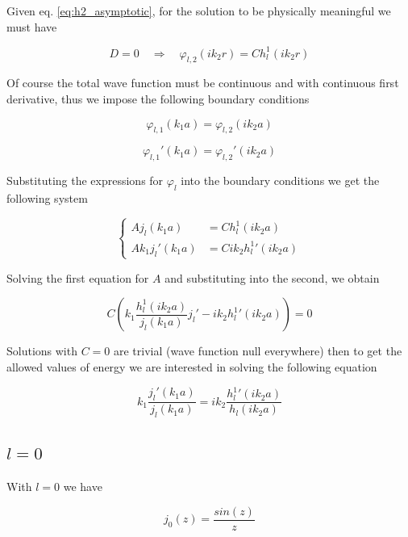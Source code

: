 \documentclass{article}
\begin{document}
Given eq. \eqref{eq:h2_asymptotic}, for the solution to be physically meaningful we must have

\begin{equation}
D = 0 \quad \Rightarrow \quad \varphi_{l,2}(ik_2r) = C h_l^1(ik_2r)
\end{equation}

Of course the total wave function must be continuous and with continuous first derivative, thus we impose the following boundary conditions

\begin{equation}
\varphi_{l,1}(k_1a) = \varphi_{l,2}(ik_2a)
\end{equation}

\begin{equation}
\varphi_{l,1}'(k_1a) = \varphi_{l,2}'(ik_2a)
\end{equation}

Substituting the expressions for \( \varphi_l \) into the boundary conditions we get the following system

\begin{equation}
  \begin{cases}
    A j_l(k_1a) & = C h_l^1(ik_2a) \\
    A k_1 j_l'(k_1a) & = C i k_2 {h_l^1}'(ik_2a)
  \end{cases}
\end{equation}

Solving the first equation for \( A \) and substituting into the second, we obtain

\begin{equation}
C \left( k_1 \frac{h_l^1(ik_2a)}{j_l(k_1a)} j_l' - i k_2 {h_l^1}'(ik_2a) \right) = 0
\end{equation}

Solutions with \( C = 0 \) are trivial (wave function null everywhere) then to get the allowed values of energy we are interested in solving the following equation

\begin{equation}
\label{eq:log_derivative}
k_1 \frac{j_l'(k_1a)}{j_l(k_1a)} = i k_2 \frac{{h_l^1}'(ik_2a)}{h_l(ik_2a)}
\end{equation}

\subsection{ \( l = 0 \) }

With \( l= 0 \) we have

\begin{equation}
j_0(z) = \frac{sin(z)}{z}
\end{equation}
\end{document}
